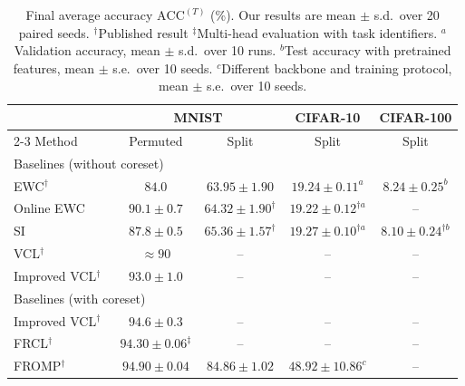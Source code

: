 \documentclass{article}
\begin{document}
\begin{table}[t]
  \centering
  \caption{Final average accuracy $\mathrm{ACC}^{(T)}$ (\%). Our results are mean
$\pm$ s.d.\ over 20 paired seeds. $^\dagger$Published result
$^\ddagger$Multi-head evaluation with task identifiers. $^a$Validation
accuracy, mean $\pm$ s.d.\ over 10 runs. $^b$Test accuracy with pretrained
features, mean $\pm$ s.e.\ over 10 seeds. $^c$Different backbone and training
protocol, mean $\pm$ s.e.\ over 10 seeds.}
  \label{tab:main_results}
  \footnotesize
  \setlength{\tabcolsep}{4pt}
  \begin{tabular*}{\textwidth}{@{\extracolsep{\fill}}lcccc@{}}
  \hline
  & \multicolumn{2}{c}{MNIST} & CIFAR-10 & CIFAR-100 \\
  \cline{2-3}
  Method & Permuted & Split & Split & Split \\
  \hline
  \multicolumn{5}{l}{Baselines (without coreset)} \\
  EWC$^\dagger$~\cite{kirkpatrick2017ewc,nguyen2018vcl,vandeven2019three,vandeven2022types,mazur2021target}
      & $84.0$ & $63.95\pm1.90$ & $19.24\pm0.11^{a}$ & $8.24\pm0.25^{b}$ \\
  Online EWC~\cite{schwarz2018progress,vandeven2019three,mazur2021target}
      & $90.1\pm0.7$ & $64.32\pm1.90^{\dagger}$ & $19.22\pm0.12^{\dagger a}$ & -- \\
  SI~\cite{zenke2017si,vandeven2019three,vandeven2022types,mazur2021target}
      & $87.8\pm0.5$ & $65.36\pm1.57^{\dagger}$
      & $19.27\pm0.10^{\dagger a}$ & $8.10\pm0.24^{\dagger b}$ \\
  VCL$^\dagger$~\cite{nguyen2018vcl}
      & $\approx90$ & -- & -- & -- \\
  Improved VCL$^\dagger$~\cite{swaroop2019improving}
      & $93.0\pm1.0$ & -- & -- & -- \\
  \hline
  \multicolumn{5}{l}{Baselines (with coreset)} \\
  Improved VCL$^\dagger$~\cite{swaroop2019improving}
      & $94.6\pm0.3$ & -- & -- & -- \\
  FRCL$^\dagger$~\cite{titsias2020frcl,rudner2022sfsvi}
      & $94.30\pm0.06^{\ddagger}$ & -- & -- & -- \\
  FROMP$^\dagger$~\cite{pan2020fromp,rudner2022sfsvi,vandeven2022types,kessler2023sequential}
      & $94.90\pm0.04$ & $84.86\pm1.02$
      & $48.92\pm10.86^{c}$ & -- \\

\end{tabular*}
\end{table}
\end{document}
